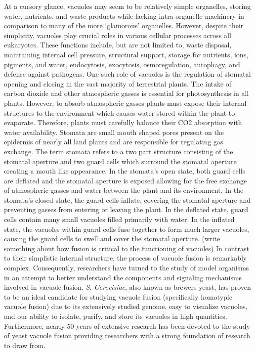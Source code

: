 \documentclass[12pt,twoside]{reedthesis}
\begin{document}
At a cursory glance, vacuoles may seem to be relatively simple organelles, storing water, nutrients, and waste products while lacking intra-organelle machinery in comparison to many of the more `glamorous' organelles. However, despite their simplicity, vacuoles play crucial roles in various cellular processes across all eukaryotes. These functions include, but are not limited to, waste disposal, maintaining internal cell pressure, structural support, storage for nutrients, ions, pigments, and water, endocytosis, exocytosis, osmoregulation, autophagy, and defense against pathogens.
\textbar{} One such role of vacuoles is the regulation of stomatal opening and closing in the vast majority of terrestrial plants. The intake of carbon dioxide and other atmospheric gasses is essential for photosynthesis in all plants. However, to absorb atmospheric gasses plants must expose their internal structures to the environment which causes water stored within the plant to evaporate. Therefore, plants must carefully balance their CO2 absorption with water availability. Stomata are small mouth shaped pores present on the epidermis of nearly all land plants and are responsible for regulating gas exchange. The term stomata refers to a two part structure consisting of the stomatal aperture and two guard cells which surround the stomatal aperture creating a mouth like appearance. In the stomata's open state, both guard cells are deflated and the stomatal aperture is exposed allowing for the free exchange of atmospheric gasses and water between the plant and its environment. In the stomata's closed state, the guard cells inflate, covering the stomatal aperture and preventing gasses from entering or leaving the plant. In the deflated state, guard cells contain many small vacuoles filled primarily with water. In the inflated state, the vacuoles within guard cells fuse together to form much larger vacuoles, causing the guard cells to swell and cover the stomatal aperture. (write something about how fusion is critical to the functioning of vacuoles)
\textbar{} In contrast to their simplistic internal structure, the process of vacuole fusion is remarkably complex. Consequently, researchers have turned to the study of model organisms in an attempt to better understand the components and signaling mechanisms involved in vacuole fusion. \emph{S. Cerevisiae}, also known as brewers yeast, has proven to be an ideal candidate for studying vacuole fusion (specifically homotypic vacuole fusion) due to its extensively studied genome, easy to visualize vacuoles, and our ability to isolate, purify, and store its vacuoles in high quantities. Furthermore, nearly 50 years of extensive research has been devoted to the study of yeast vacuole fusion providing researchers with a strong foundation of research to draw from.
\end{document}
